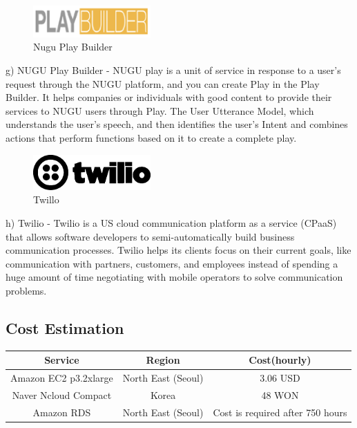 \documentclass[conference]{IEEEtran}
\begin{document}
\begin{figure}[!htbp]
\centering
    \includegraphics[width =4.5cm]{nuguplaybuilder.eps}
    \hfil
\caption{Nugu Play Builder}
\end{figure}

g)	NUGU Play Builder
-	NUGU play is a unit of service in response to a user's request through the NUGU platform, and you can create Play in the Play Builder. It helps companies or individuals with good content to provide their services to NUGU users through Play. The User Utterance Model, which understands the user's speech, and then identifies the user's Intent and combines actions that perform functions based on it to create a complete play.

\begin{figure}[!htbp]
\centering
    \includegraphics[width =4.5cm]{twilio.eps}
    \hfil
\caption{Twillo}
\end{figure}
h)	Twilio
-	Twilio is a US cloud communication platform as a service (CPaaS) that allows software developers to semi-automatically build business communication processes. Twilio helps its clients focus on their current goals, like communication with partners, customers, and employees instead of spending a huge amount of time negotiating with mobile operators to solve communication problems.\\


\subsection{Cost Estimation}

\begin{table}[h]
\begin{tabular}{|c|c|c|}
\hline
Service               & Region             & Cost(hourly)                       \\
\hline
Amazon EC2 p3.2xlarge & North East (Seoul) & 3.06 USD                           \\
\hline
Naver Ncloud Compact  & Korea              & 48 WON                             \\
\hline
Amazon RDS            & North East (Seoul) & Cost is required after 750   hours\\
\hline
\end{tabular}
\end{table}
\end{document}
